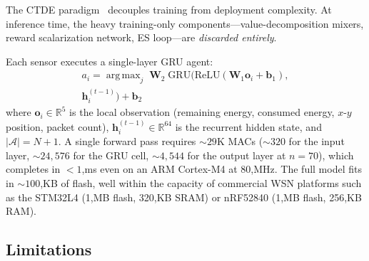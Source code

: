 \documentclass[journal]{IEEEtran}
\DeclareMathOperator*{\argmax}{arg\,max}
\begin{document}
The CTDE paradigm~\cite{kraemer2016multi,lowe2017multi} decouples training from deployment complexity. At inference time, the heavy training-only components---value-decomposition mixers, reward scalarization network, ES loop---are \emph{discarded entirely}.

\begin{table}[!t]
\caption{Component deployment map under CTDE. Only the per-sensor agent and GAPF controller are active at inference.}
\label{tab:deployment_components}
\renewcommand{\arraystretch}{1.15}
\end{table}

Each sensor executes a single-layer GRU agent:
\begin{multline}
a_i = \argmax_{j}\; \mathbf{W}_2 \;\mathrm{GRU}\!\bigl(\mathrm{ReLU}(\mathbf{W}_1 \mathbf{o}_i + \mathbf{b}_1),\\
\mathbf{h}_{i}^{(t-1)}\bigr) + \mathbf{b}_2
\label{eq:agent_forward}
\end{multline}
where $\mathbf{o}_i \in \mathbb{R}^5$ is the local observation (remaining energy, consumed energy, $x$-$y$ position, packet count), $\mathbf{h}_i^{(t-1)} \in \mathbb{R}^{64}$ is the recurrent hidden state, and $|\mathcal{A}|{=}N{+}1$. A single forward pass requires ${\sim}29$K MACs (${\sim}320$ for the input layer, ${\sim}24{,}576$ for the GRU cell, ${\sim}4{,}544$ for the output layer at $n{=}70$), which completes in $<1$,ms even on an ARM Cortex-M4 at 80,MHz. The full model fits in ${\sim}100$,KB of flash, well within the capacity of commercial WSN platforms such as the STM32L4 (1,MB flash, 320,KB SRAM) or nRF52840 (1,MB flash, 256,KB RAM).

\subsection{Limitations}
\label{sec:limitations}
\end{document}
